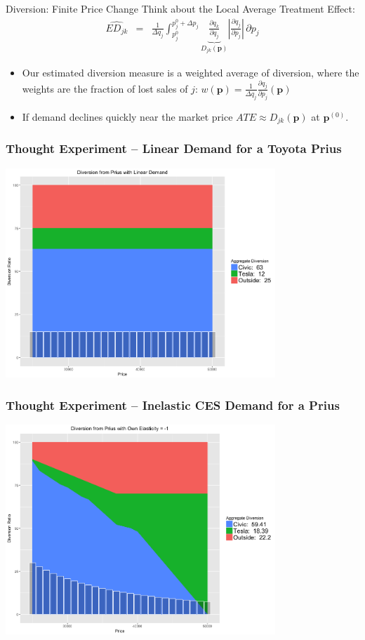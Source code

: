 \documentclass[xcolor=pdftex,dvipsnames,table,mathserif]{beamer}
\begin{document}
\begin{frame}{Diversion: Finite Price Change}
Think about the \alert{Local Average Treatment Effect}:
\begin{eqnarray*}
\widehat{ED_{jk} }&=& \frac{1}{\Delta q_j} \int_{p_j^{0}}^{p_j^{0}+\Delta p_j} \underbrace{\frac{\partial q_k}{\partial q_j}}_{D_{jk}(\mathbf{p})} \left| \frac{\partial q_j}{\partial p_j} \right|\, \partial p_j
\end{eqnarray*}
\begin{itemize}
\item Our estimated diversion measure is a weighted average of diversion, where the weights are the fraction of lost sales of $j$:  $w(\mathbf{p}) = \frac{1}{\Delta q_j} \frac{\partial q_j}{\partial p_j} (\mathbf{p})$
\item If demand declines quickly near the market price $ATE \approx D_{jk}(\mathbf{p})$ at $\mathbf{p}^{(0)}$.
\end{itemize}
\end{frame}

\begin{frame}
\frametitle{Thought Experiment -- Linear Demand for a Toyota Prius}
\begin{center}
\includegraphics[width=4in]{./resources/new_prius_linear.png}
\end{center}
\end{frame}

\begin{frame}
\frametitle{Thought Experiment -- Inelastic CES Demand for a Prius}
\begin{center}
\includegraphics[width=4in]{./resources/new_prius1.png}
\end{center}
\end{frame}
\end{document}

